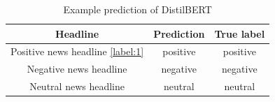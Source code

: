   \begin{table}[!ht]
    \centering
    \caption{Example prediction of DistilBERT}
    \begin{tabular}{ccc}
      \toprule
          Headline &  Prediction & True label \\
          \midrule
          Positive news headline \ref{label:1} & positive & positive \\
          Negative news headline & negative & negative \\
          Neutral news headline & neutral & neutral \\
          \bottomrule
    \end{tabular}
  \end{table}
\newpage



